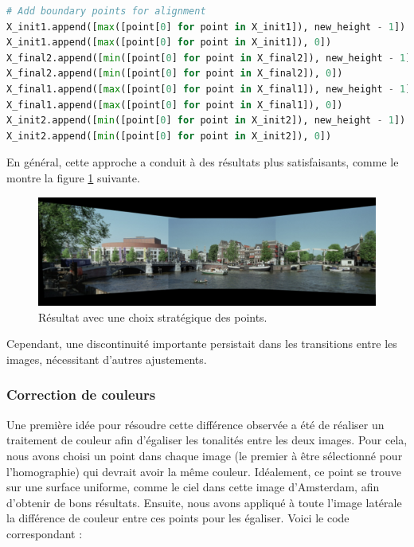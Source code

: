 \documentclass[../5RO17_TP1.tex]{subfiles}
\begin{document}
\begin{scriptsize}\mycode
	\begin{lstlisting}[language=Python]
# Add boundary points for alignment
X_init1.append([max([point[0] for point in X_init1]), new_height - 1])
X_init1.append([max([point[0] for point in X_init1]), 0])
X_final2.append([min([point[0] for point in X_final2]), new_height - 1])
X_final2.append([min([point[0] for point in X_final2]), 0])
X_final1.append([max([point[0] for point in X_final1]), new_height - 1])
X_final1.append([max([point[0] for point in X_final1]), 0])
X_init2.append([min([point[0] for point in X_init2]), new_height - 1])
X_init2.append([min([point[0] for point in X_init2]), 0])
	\end{lstlisting}
\end{scriptsize}

En général, cette approche a conduit à des résultats plus satisfaisants, comme le montre la figure \ref{fig:ams1} suivante.

\begin{figure}[!h]
    \centering
    \includegraphics[width=0.6\linewidth]{images/amsterdam_sans_color.png}
    \caption{Résultat avec une choix stratégique des points.}
    \label{fig:ams1}
\end{figure}


Cependant, une discontinuité importante persistait dans les transitions entre les images, nécessitant d'autres ajustements.
\subsubsection{Correction de couleurs}

Une première idée pour résoudre cette différence observée a été de réaliser un traitement de couleur afin d'égaliser les tonalités entre les deux images. Pour cela, nous avons choisi un point dans chaque image (le premier à être sélectionné pour l'homographie) qui devrait avoir la même couleur. Idéalement, ce point se trouve sur une surface uniforme, comme le ciel dans cette image d'Amsterdam, afin d'obtenir de bons résultats. Ensuite, nous avons appliqué à toute l'image latérale la différence de couleur entre ces points pour les égaliser. Voici le code correspondant :
\end{document}
